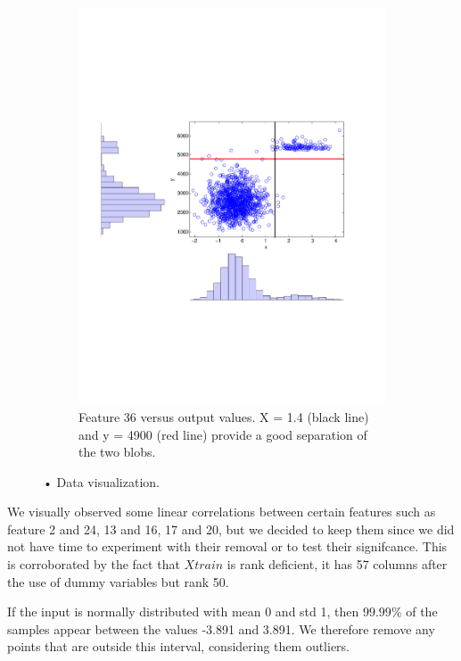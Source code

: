 \documentclass{article} %
\begin{document}
\begin{figure}[ht]
\begin{subfigure}[b]{0.45\textwidth}
    \includegraphics[width=\textwidth]{figures/feature36_crop.pdf}
    \caption{Feature 36 versus output values. X = 1.4 (black line) and y = 4900 (red line)  provide a good separation of the two blobs.}
    \label{fig:feature36}
  \end{subfigure}
  \caption{• Data visualization. }
\end{figure}

We visually observed some linear correlations between certain features such as feature 2 and 24, 13 and 16, 17 and 20, but we decided to keep them since we did not have time to experiment with their removal or to test their signifcance. This is corroborated by the fact that $Xtrain$ is rank deficient, it has 57 columns after the use of dummy variables but rank 50.

If the input is normally distributed with mean 0 and std 1, then
 $99.99\%$ of the samples appear between the values -3.891 and 3.891. We therefore remove any points that are outside this interval, considering them outliers.
\end{document}
